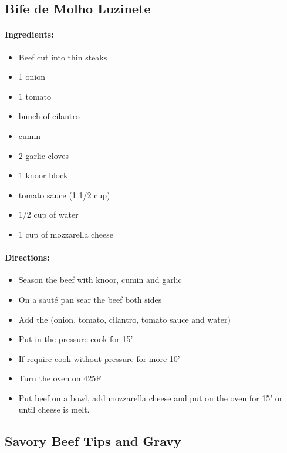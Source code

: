 \documentclass{article}
\begin{document}
\subsection{Bife de Molho Luzinete}

\paragraph{Ingredients:}

\begin{itemize}
	\item Beef cut into thin steaks
	\item 1 onion
	\item 1 tomato
	\item bunch of cilantro
	\item cumin
	\item 2 garlic cloves
	\item 1 knoor block
	\item tomato sauce (1 1/2 cup)
	\item 1/2 cup of water
	\item 1 cup of mozzarella cheese
\end{itemize}

\paragraph{Directions:}
\begin{itemize}
	\item Season the beef with knoor, cumin and garlic
	\item On a sauté pan sear the beef both sides
	\item Add the (onion, tomato, cilantro, tomato sauce and water)
	\item Put in the pressure cook for 15'
	\item If require cook without pressure for more 10'
	\item Turn the oven on 425F
	\item Put beef on a bowl, add mozzarella cheese and put on the oven for 15' or until cheese is melt.
\end{itemize}

\subsection{Savory Beef Tips and Gravy}
\end{document}
